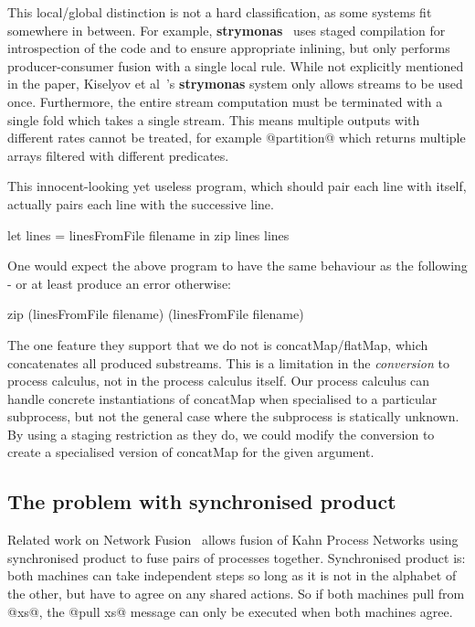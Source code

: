 This local/global distinction is not a hard classification, as some systems fit somewhere in between.
For example, {\bf strymonas}~\cite{kiselyov2016stream} uses staged compilation for introspection of the code and to ensure appropriate inlining, but only performs producer-consumer fusion with a single local rule.
While not explicitly mentioned in the paper, Kiselyov et al~\cite{kiselyov2016stream}'s {\bf strymonas} system only allows streams to be used once.
Furthermore, the entire stream computation must be terminated with a single fold which takes a single stream.
This means multiple outputs with different rates cannot be treated, for example @partition@ which returns multiple arrays filtered with different predicates.

This innocent-looking yet useless program, which should pair each line with itself, actually pairs each line with the successive line.
\begin{code}
let lines = linesFromFile filename
in  zip lines lines
\end{code}

One would expect the above program to have the same behaviour as the following - or at least produce an error otherwise:
\begin{code}
zip (linesFromFile filename) (linesFromFile filename)
\end{code}

The one feature they support that we do not is concatMap/flatMap, which concatenates all produced substreams.
This is a limitation in the \emph{conversion} to process calculus, not in the process calculus itself.
Our process calculus can handle concrete instantiations of concatMap when specialised to a particular subprocess, but not the general case where the subprocess is statically unknown.
By using a staging restriction as they do, we could modify the conversion to create a specialised version of concatMap for the given argument.


\subsection{The problem with synchronised product}
\label{s:Synchro}
Related work on Network Fusion~\cite{fradet2004network} allows fusion of Kahn Process Networks using synchronised product to fuse pairs of processes together.
Synchronised product is: both machines can take independent steps so long as it is not in the alphabet of the other, but have to agree on any shared actions.
So if both machines pull from @xs@, the @pull xs@ message can only be executed when both machines agree.

